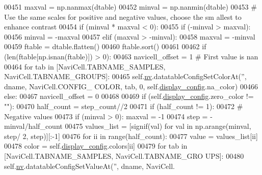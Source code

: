 \begin{DoxyCode}
00451             maxval = np.nanmax(dtable)
00452             minval = np.nanmin(dtable)
00453             \textcolor{comment}{# Use the same scales for positive and negative values, choose the sm
      allest to enhance contrast}
00454             \textcolor{keywordflow}{if} (minval * maxval < 0):
00455                 \textcolor{keywordflow}{if} (-minval > maxval):
00456                     minval = -maxval
00457                 \textcolor{keywordflow}{elif} (maxval > -minval):
00458                     maxval = -minval
00459             ftable = dtable.flatten()
00460             ftable.sort()
00461 
00462             \textcolor{keywordflow}{if} (len(ftable[np.isnan(ftable)]) > 0):
00463                 navicell\_offset = 1 \textcolor{comment}{# First value is nan}
00464                 \textcolor{keywordflow}{for} tab \textcolor{keywordflow}{in} [NaviCell.TABNAME\_SAMPLES, NaviCell.TABNAME\_GROUPS]:
00465                     self.\hyperlink{classnavicom_1_1navicom_1_1NaviCom_af740fe52f9f3cfc076ae88ca696bd05e}{nv}.datatableConfigSetColorAt(\textcolor{stringliteral}{''}, dname, NaviCell.CONFIG\_
      COLOR, tab, 0, self.\hyperlink{classnavicom_1_1navicom_1_1NaviCom_a56628d774db59cb8b06af3801fb6306c}{display_config}.na\_color)
00466             \textcolor{keywordflow}{else}:
00467                 navicell\_offset = 0
00468 
00469             \textcolor{keywordflow}{if} (self.\hyperlink{classnavicom_1_1navicom_1_1NaviCom_a56628d774db59cb8b06af3801fb6306c}{display_config}.zero\_color != \textcolor{stringliteral}{""}):
00470                 half\_count = step\_count//2
00471                 \textcolor{keywordflow}{if} (half\_count != 1):
00472                     \textcolor{comment}{# Negative values}
00473                     \textcolor{keywordflow}{if} (minval > 0): maxval = -1
00474                     step = -minval/half\_count
00475                     values\_list = [signif(val) \textcolor{keywordflow}{for} val \textcolor{keywordflow}{in} np.arange(minval, step/
      2, step)][:-1]
00476                     \textcolor{keywordflow}{for} ii \textcolor{keywordflow}{in} range(half\_count):
00477                        value = values\_list[ii]
00478                        color = self.\hyperlink{classnavicom_1_1navicom_1_1NaviCom_a56628d774db59cb8b06af3801fb6306c}{display_config}.colors[ii]
00479                        \textcolor{keywordflow}{for} tab \textcolor{keywordflow}{in} [NaviCell.TABNAME\_SAMPLES, NaviCell.TABNAME\_GRO
      UPS]:
00480                            self.\hyperlink{classnavicom_1_1navicom_1_1NaviCom_af740fe52f9f3cfc076ae88ca696bd05e}{nv}.datatableConfigSetValueAt(\textcolor{stringliteral}{''}, dname, NaviCell.

\end{DoxyCode}
